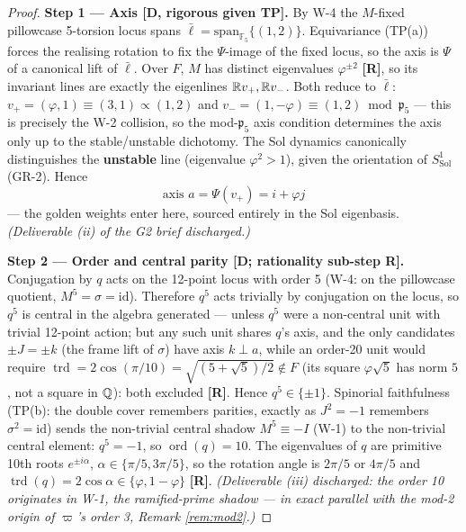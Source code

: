 \documentclass[11pt,a4paper]{article}
\theoremstyle{plain}
\theoremstyle{definition}
\theoremstyle{remark}
\newcommand{\FF}[1]{\mathbb{F}_{#1}}
\newcommand{\pfive}{\mathfrak{p}_5}
\newcommand{\rtag}[1]{\textnormal{\textbf{[#1]}}}
\DeclareMathOperator{\trd}{trd}
\DeclareMathOperator{\ord}{ord}
\begin{document}
\begin{proof}
\textbf{Step 1 --- Axis \rtag{D, rigorous given TP}.}
By W-4 the $M$-fixed pillowcase 5-torsion locus spans $\bar\ell = \mathrm{span}_{\FF5}\{(1,2)\}$. Equivariance (TP(a)) forces the realising rotation to fix the $\Psi$-image of the fixed locus, so the axis is $\Psi$ of a canonical lift of $\bar\ell$. Over $F$, $M$ has distinct eigenvalues $\varphi^{\pm2}$ \rtag{R}, so its invariant lines are exactly the eigenlines $\mathbb{R} v_+, \mathbb{R} v_-$. Both reduce to $\bar\ell$: $v_+ = (\varphi, 1) \equiv (3,1) \propto (1,2)$ and $v_- = (1, -\varphi) \equiv (1,2) \bmod \pfive$ --- this is precisely the W-2 collision, so the mod-$\pfive$ axis condition determines the axis only up to the stable/unstable dichotomy. The Sol dynamics canonically distinguishes the \textbf{unstable} line (eigenvalue $\varphi^2 > 1$), given the orientation of $S^1_{\mathrm{Sol}}$ (GR-2). Hence
\begin{equation}\label{eq:axis}
\text{axis } a = \Psi(v_+) = i + \varphi j
\end{equation}
--- the golden weights enter here, sourced entirely in the Sol eigenbasis. \emph{(Deliverable (ii) of the G2 brief discharged.)}

\medskip
\textbf{Step 2 --- Order and central parity \rtag{D; rationality sub-step R}.}
Conjugation by $q$ acts on the 12-point locus with order 5 (W-4: on the pillowcase quotient, $M^5 = \sigma = \mathrm{id}$). Therefore $q^5$ acts trivially by conjugation on the locus, so $q^5$ is central in the algebra generated --- unless $q^5$ were a non-central unit with trivial 12-point action; but any such unit shares $q$'s axis, and the only candidates $\pm J = \pm k$ (the frame lift of $\sigma$) have axis $k \perp a$, while an order-20 unit would require $\trd = 2\cos(\pi/10) = \sqrt{(5+\sqrt5)/2} \notin F$ (its square $\varphi\sqrt5$ has norm $5$, not a square in $\mathbb{Q}$): both excluded \rtag{R}. Hence $q^5 \in \{\pm1\}$. Spinorial faithfulness (TP(b): the double cover remembers parities, exactly as $J^2 = -1$ remembers $\sigma^2 = \mathrm{id}$) sends the non-trivial central shadow $M^5 \equiv -I$ (W-1) to the non-trivial central element: $q^5 = -1$, so $\ord(q) = 10$. The eigenvalues of $q$ are primitive 10th roots $e^{\pm i\alpha}$, $\alpha \in \{\pi/5, 3\pi/5\}$, so the rotation angle is $2\pi/5$ or $4\pi/5$ and $\trd(q) = 2\cos\alpha \in \{\varphi, 1-\varphi\}$ \rtag{R}. \emph{(Deliverable (iii) discharged: the order 10 originates in W-1, the ramified-prime shadow --- in exact parallel with the mod-2 origin of $\varpi$'s order 3, Remark \ref{rem:mod2}.)}


\end{proof}
\end{document}
